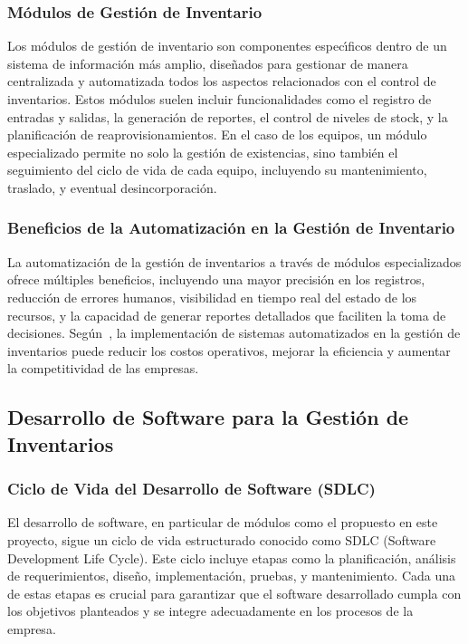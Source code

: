 \documentclass[stu, 12pt, letterpaper, donotrepeattitle, floatsintext, natbib]{apa7}
\begin{document}
\subsubsection{M\'odulos de Gesti\'on de Inventario}
Los m\'odulos de gesti\'on de inventario son componentes espec\'{\i}ficos dentro de un sistema de informaci\'on m\'as amplio, dise\~{n}ados para gestionar de manera centralizada y automatizada todos los aspectos relacionados con el control de
inventarios. Estos m\'odulos suelen incluir funcionalidades como el registro de entradas y salidas, la generaci\'on de reportes, el control de niveles de stock, y la planificaci\'on de reaprovisionamientos. En el caso de los equipos,
un m\'odulo especializado permite no solo la gesti\'on de existencias, sino tambi\'en el seguimiento del ciclo de vida de cada equipo, incluyendo su mantenimiento, traslado, y eventual desincorporaci\'on.
\subsubsection{Beneficios de la Automatizaci\'on en la Gesti\'on de Inventario}
La automatizaci\'on de la gesti\'on de inventarios a trav\'es de m\'odulos especializados ofrece m\'ultiples beneficios, incluyendo una mayor precisi\'on en los registros, reducci\'on de errores humanos, visibilidad en tiempo real del estado
de los recursos, y la capacidad de generar reportes detallados que faciliten la toma de decisiones. Seg\'un~\cite{ll}, la implementaci\'on de sistemas automatizados en la gesti\'on de inventarios puede reducir los costos
operativos, mejorar la eficiencia y aumentar la competitividad de las empresas.
\subsection{Desarrollo de Software para la Gesti\'on de Inventarios}
\subsubsection{Ciclo de Vida del Desarrollo de Software (SDLC)}
El desarrollo de software, en particular de m\'odulos como el propuesto en este proyecto, sigue un ciclo de vida estructurado conocido como SDLC (Software Development Life Cycle). Este ciclo incluye etapas como la planificaci\'on,
an\'alisis de requerimientos, dise\~{n}o, implementaci\'on, pruebas, y mantenimiento. Cada una de estas etapas es crucial para garantizar que el software desarrollado cumpla con los objetivos planteados y se integre adecuadamente en
los procesos de la empresa.
\end{document}
